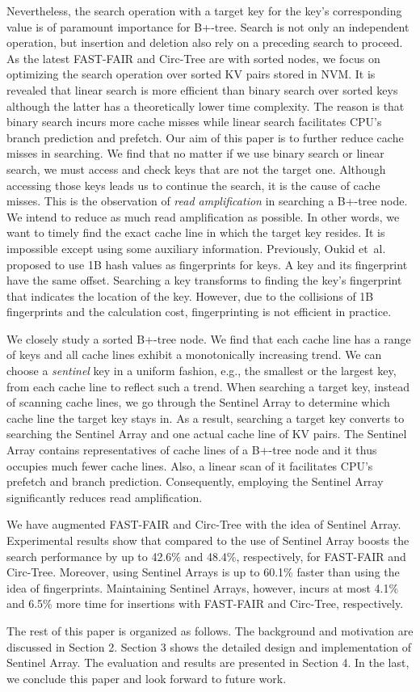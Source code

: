 Nevertheless, the search operation with a target key for the key's corresponding value 
is of paramount importance for B+-tree. 
Search is not only an independent operation, but 
insertion and deletion also rely on a preceding search 
to proceed. 
As the latest FAST-FAIR and Circ-Tree are with sorted nodes, we focus on optimizing the search operation over sorted KV pairs stored in NVM.
It is revealed that linear search is more efficient than binary search over sorted keys although the latter has a theoretically lower time complexity.
The reason is that binary search incurs more cache misses while linear search facilitates CPU's branch prediction and prefetch.
Our aim of this paper is to further reduce cache misses in searching. We find that no matter if we use binary search or linear search,
we must access and check keys that are not the target one. Although accessing those keys leads us to continue the search, it is the cause of cache misses. 
This is the observation of {\em read amplification} in searching a B+-tree node. 
We intend to reduce as much read amplification as possible.
In other words, we want to timely find the exact cache line in which the target key resides. It is impossible except using some auxiliary information.
Previously, Oukid et~al.~\cite{oukid2016fptree} proposed to use 1B hash values as fingerprints for keys. 
A key and its fingerprint have the same offset. Searching a key transforms to finding the key's fingerprint that 
indicates the location of the key. However,
due to the collisions of 1B fingerprints and the calculation cost, fingerprinting is not efficient in practice. 

We closely study a sorted B+-tree node. We find that each cache line has a range of keys and all cache lines
exhibit a monotonically increasing trend. We can choose a {\em sentinel} key in a uniform fashion, e.g., the smallest or the largest key, 
from each cache line to reflect such a trend. When searching a target key, instead of scanning cache lines, we 
go through the Sentinel Array to determine which cache line the target key stays in. 
As a result, searching a target key converts to searching the Sentinel Array and one actual cache line of KV pairs.
The Sentinel Array contains representatives of cache lines of a B+-tree node and it thus
occupies much fewer cache lines. Also, a linear scan of it facilitates CPU's prefetch and branch prediction.
Consequently, employing the Sentinel Array significantly reduces read amplification. 

We have augmented FAST-FAIR and Circ-Tree with
the idea of Sentinel Array. Experimental results show that compared to the use of Sentinel Array boosts the search performance by up to 42.6\%
and 48.4\%, respectively, for FAST-FAIR and Circ-Tree. Moreover, using Sentinel Arrays is up to 60.1\% faster than using the idea of fingerprints.
Maintaining Sentinel Arrays, however, incurs at most 4.1\% and 6.5\% more time for insertions with
FAST-FAIR and Circ-Tree, respectively.

The rest of this paper is organized as follows. The background and motivation are discussed in Section 2. Section 3 shows the detailed design and implementation of Sentinel Array. The evaluation and results are presented in Section 4. In the last, we conclude this paper and look forward to future work.
